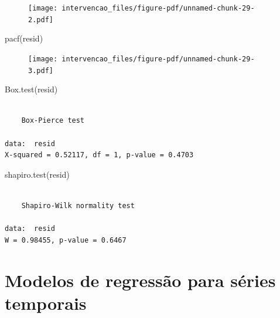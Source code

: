 \documentclass[
  letterpaper,
  DIV=11,
  numbers=noendperiod]{scrartcl}
\newenvironment{Shaded}{\begin{snugshade}}{\end{snugshade}}
\newcommand{\FunctionTok}[1]{\textcolor[rgb]{0.28,0.35,0.67}{#1}}
\newcommand{\NormalTok}[1]{\textcolor[rgb]{0.00,0.23,0.31}{#1}}
\theoremstyle{plain}
\theoremstyle{plain}
\theoremstyle{definition}
\theoremstyle{definition}
\theoremstyle{remark}
\begin{document}
\begin{figure}[H]

{\centering \texttt{[image: intervencao\_files/figure-pdf/unnamed-chunk-29-2.pdf]}

}

\end{figure}

\begin{Shaded}
\begin{Highlighting}[]
\FunctionTok{pacf}\NormalTok{(resid)}
\end{Highlighting}
\end{Shaded}

\begin{figure}[H]

{\centering \texttt{[image: intervencao\_files/figure-pdf/unnamed-chunk-29-3.pdf]}

}

\end{figure}

\begin{Shaded}
\begin{Highlighting}[]
\FunctionTok{Box.test}\NormalTok{(resid)}
\end{Highlighting}
\end{Shaded}

\begin{verbatim}

    Box-Pierce test

data:  resid
X-squared = 0.52117, df = 1, p-value = 0.4703
\end{verbatim}

\begin{Shaded}
\begin{Highlighting}[]
\FunctionTok{shapiro.test}\NormalTok{(resid)}
\end{Highlighting}
\end{Shaded}

\begin{verbatim}

    Shapiro-Wilk normality test

data:  resid
W = 0.98455, p-value = 0.6467
\end{verbatim}


\hypertarget{modelos-de-regressuxe3o-para-suxe9ries-temporais}{%
\chapter{Modelos de regressão para séries
temporais}\label{modelos-de-regressuxe3o-para-suxe9ries-temporais}}
\end{document}
